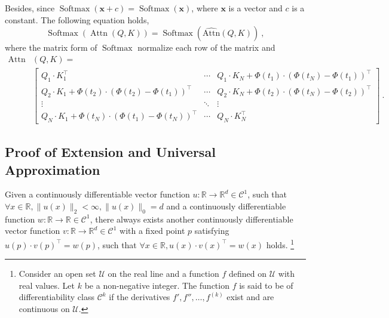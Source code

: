 Besides, since $\operatorname{Softmax}(\textbf{x} + c)=\operatorname{Softmax}(\textbf{x})$, where $\textbf{x}$ is a vector and $c$ is a constant. The following equation holds,
\begin{equation}
\operatorname{Softmax}(\operatorname{Attn}(Q, K)) = \operatorname{Softmax}(\operatorname{\widehat{Attn}}(Q, K)) ~,
\end{equation}
where the matrix form of $\operatorname{Softmax}$ normalize each row of the matrix and 
\begin{equation}
\begin{aligned}
\operatorname{Attn}& (Q, K)= \\
& \left[\begin{array}{cccc}
Q_1 \cdot K_1^\top & \cdots & Q_1 \cdot K_N + \Phi(t_1) \cdot (\Phi(t_N) - \Phi(t_1))^\top  \\ 
Q_2 \cdot K_1 + \Phi(t_2) \cdot (\Phi(t_2) - \Phi(t_1))^\top  & \cdots & Q_2 \cdot K_N + \Phi(t_2) \cdot (\Phi(t_N) - \Phi(t_2))^\top \\ 
\vdots & \ddots & \vdots \\
Q_N \cdot K_1 + \Phi(t_N) \cdot (\Phi(t_1) - \Phi(t_N))^\top & \cdots & Q_N \cdot K_N^\top
\end{array}\right] ~.
\end{aligned}
\end{equation}

\subsection{Proof of Extension and Universal Approximation} 

\begin{lemma} 
Given a continuously differentiable vector function $u: \mathbb{R} \rightarrow \mathbb{R}^d \in \mathcal{C}^1$, such that $\forall x \in \mathbb{R}, \|u(x)\|_2 < \infty, \|u(x)\|_0 = d$ and a continuously differentiable function $w: \mathbb{R} \rightarrow \mathbb{R} \in \mathcal{C}^1$, there always exists another continuously differentiable vector function $v: \mathbb{R} \rightarrow \mathbb{R}^d \in \mathcal{C}^1$ with a fixed point $p$ satisfying $u(p) \cdot v(p)^\top = w(p)$, such that $\forall x \in \mathbb{R}, u(x) \cdot v(x)^\top = w(x)$ holds. \footnote{Consider an open set $\mathcal{U}$ on the real line and a function $f$ defined on $\mathcal{U}$ with real values. Let $k$ be a non-negative integer. The function $f$ is said to be of differentiability class $\mathcal{C}^{k}$ if the derivatives  $f',f'',\dots ,f^{(k)}$ exist and are continuous on $\mathcal{U}$.}
\end{lemma}

